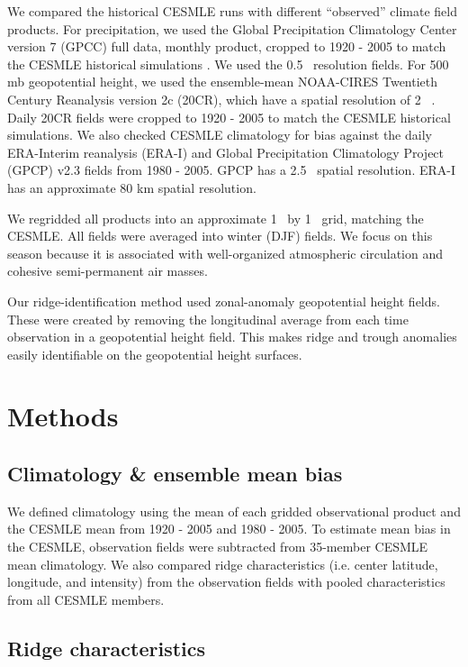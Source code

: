 \documentclass[final, double]{ua-thesis}
\begin{document}
We compared the historical CESMLE runs with different ``observed'' climate field products. For precipitation, we used the Global Precipitation Climatology Center version 7 (GPCC) full data, monthly product, cropped to 1920 - 2005 to match the CESMLE historical simulations \citep{3schneider_gpcc_2015}. We used the 0.5\textdegree~ resolution fields. For 500 mb geopotential height, we used the ensemble-mean NOAA-CIRES Twentieth Century Reanalysis version 2c (20CR), which have a spatial resolution of 2\textdegree~ \citep{3compo_twentieth_2011}. Daily 20CR fields were cropped to 1920 - 2005 to match the CESMLE historical simulations. We also checked CESMLE climatology for bias against the daily ERA-Interim reanalysis (ERA-I) \citep{3dee_era-interim_2011} and Global Precipitation Climatology Project (GPCP) v2.3 fields \citep{3adler_version-2_2003} from 1980 - 2005. GPCP has a 2.5\textdegree~ spatial resolution. ERA-I has an approximate 80 km spatial resolution. 

We regridded all products into an approximate 1\textdegree~ by 1\textdegree~ grid, matching the CESMLE. All fields were averaged into winter (DJF) fields. We focus on this season because it is associated with well-organized atmospheric circulation and cohesive semi-permanent air masses.

Our ridge-identification method used zonal-anomaly geopotential height fields. These were created by removing the longitudinal average from each time observation in a geopotential height field. This makes ridge and trough anomalies easily identifiable on the geopotential height surfaces.

\section{Methods}


\subsection{Climatology \& ensemble mean bias}

We defined climatology using the mean of each gridded observational product and the CESMLE mean from 1920 - 2005 and 1980 - 2005. To estimate mean bias in the CESMLE, observation fields were subtracted from 35-member CESMLE mean climatology. We also compared ridge characteristics (i.e. center latitude, longitude, and intensity) from the observation fields with pooled characteristics from all CESMLE members.

\subsection{Ridge characteristics}
\end{document}
